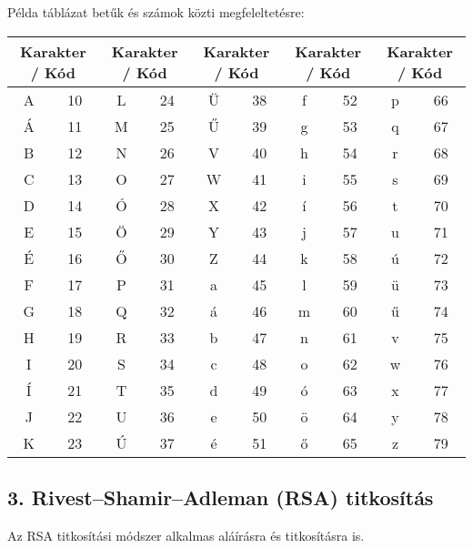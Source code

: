 Példa táblázat betűk és számok közti megfeleltetésre:

\begin{tabular}{|c|c|c|c|c|c|c|c|c|c|}
\hline 
\multicolumn{2}{|c|}{Karakter / Kód} & \multicolumn{2}{c|}{Karakter / Kód} & \multicolumn{2}{c|}{Karakter / Kód} & \multicolumn{2}{c|}{Karakter / Kód} & \multicolumn{2}{c|}{Karakter / Kód}\tabularnewline
\hline 
A  & 10  & L  & 24  & Ü  & 38  & f  & 52  & p  & 66 \tabularnewline
Á  & 11  & M  & 25  & Ű  & 39  & g  & 53  & q  & 67 \tabularnewline
B  & 12  & N  & 26  & V  & 40  & h  & 54  & r  & 68 \tabularnewline
C  & 13  & O  & 27  & W  & 41  & i  & 55  & s  & 69 \tabularnewline
D  & 14  & Ó  & 28  & X  & 42  & í  & 56  & t  & 70 \tabularnewline
E  & 15  & Ö  & 29  & Y  & 43  & j  & 57  & u  & 71 \tabularnewline
É  & 16  & Ő  & 30  & Z  & 44  & k  & 58  & ú  & 72 \tabularnewline
F  & 17  & P  & 31  & a  & 45  & l  & 59  & ü  & 73 \tabularnewline
G  & 18  & Q  & 32  & á  & 46  & m  & 60  & ű  & 74 \tabularnewline
H  & 19  & R  & 33  & b  & 47  & n  & 61  & v  & 75 \tabularnewline
I  & 20  & S  & 34  & c  & 48  & o  & 62  & w  & 76 \tabularnewline
Í  & 21  & T  & 35  & d  & 49  & ó  & 63  & x  & 77 \tabularnewline
J  & 22  & U  & 36  & e  & 50  & ö  & 64  & y  & 78 \tabularnewline
K  & 23  & Ú  & 37  & é  & 51  & ő  & 65  & z  & 79 \tabularnewline
\hline 
\end{tabular}\label{Attila_tabular}

\subsection*{3. Rivest--Shamir--Adleman (RSA) titkosítás}

Az RSA titkosítási módszer alkalmas aláírásra és titkosításra is.

